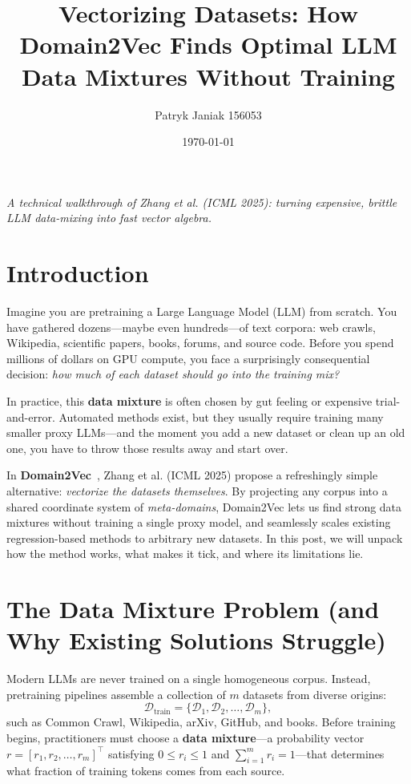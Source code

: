 \documentclass[12pt]{article}
\title{Vectorizing Datasets: How Domain2Vec Finds Optimal LLM Data Mixtures Without Training}
\author{Patryk Janiak 156053}
\date{\today}
\begin{document}
\maketitle

\begin{center}
\textit{A technical walkthrough of Zhang et al. (ICML 2025): turning expensive, brittle LLM data-mixing into fast vector algebra.}
\end{center}

\section*{Introduction}

Imagine you are pretraining a Large Language Model (LLM) from scratch. You have gathered dozens—maybe even hundreds—of text corpora: web crawls, Wikipedia, scientific papers, books, forums, and source code. Before you spend millions of dollars on GPU compute, you face a surprisingly consequential decision: \emph{how much of each dataset should go into the training mix?}

In practice, this \textbf{data mixture} is often chosen by gut feeling or expensive trial-and-error. Automated methods exist, but they usually require training many smaller proxy LLMs—and the moment you add a new dataset or clean up an old one, you have to throw those results away and start over.

In \textbf{Domain2Vec}~\cite{zhang2025domain2vec}, Zhang et al. (ICML 2025) propose a refreshingly simple alternative: \emph{vectorize the datasets themselves}. By projecting any corpus into a shared coordinate system of \emph{meta-domains}, Domain2Vec lets us find strong data mixtures without training a single proxy model, and seamlessly scales existing regression-based methods to arbitrary new datasets. In this post, we will unpack how the method works, what makes it tick, and where its limitations lie.

\section*{The Data Mixture Problem (and Why Existing Solutions Struggle)}

Modern LLMs are never trained on a single homogeneous corpus. Instead, pretraining pipelines assemble a collection of $m$ datasets from diverse origins:
\[
\mathcal{D}_{\text{train}} = \{\mathcal{D}_1, \mathcal{D}_2, \dots, \mathcal{D}_m\},
\]
such as Common Crawl, Wikipedia, arXiv, GitHub, and books. Before training begins, practitioners must choose a \textbf{data mixture}—a probability vector $r = [r_1, r_2, \dots, r_m]^\top$ satisfying $0 \le r_i \le 1$ and $\sum_{i=1}^m r_i = 1$—that determines what fraction of training tokens comes from each source.
\end{document}
